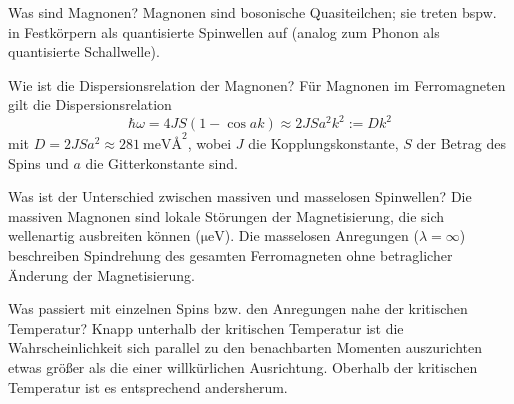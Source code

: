 \begin{fquestion}{Was sind Magnonen?}
    Magnonen sind bosonische Quasiteilchen; sie treten bspw. in Festkörpern als quantisierte Spinwellen auf (analog zum Phonon als quantisierte Schallwelle).
\end{fquestion}

\begin{fquestion}{Wie ist die Dispersionsrelation der Magnonen?}
    Für Magnonen im Ferromagneten gilt die Dispersionsrelation 
    \[ \hbar \omega = 4 J S (1 - \cos a k) \approx 2 J S a^2 k^2 := D k^2 \]
    mit $D = 2 J S a^2 \approx \SI{281}{\milli\electronvolt\angstrom\squared}$, wobei $J$ die Kopplungskonstante, $S$ der Betrag des Spins und $a$ die Gitterkonstante sind.
\end{fquestion}






\begin{fquestion}{Was ist der Unterschied zwischen massiven und masselosen Spinwellen?}
    Die massiven Magnonen sind lokale Störungen der Magnetisierung, die sich wellenartig ausbreiten können ($\si{\micro\electronvolt}$).
    Die masselosen Anregungen ($\lambda = \infty$) beschreiben Spindrehung des gesamten Ferromagneten ohne betraglicher Änderung der Magnetisierung.
\end{fquestion}

\begin{fquestion}{Was passiert mit einzelnen Spins bzw. den Anregungen nahe der kritischen Temperatur?}
    Knapp unterhalb der kritischen Temperatur ist die Wahrscheinlichkeit sich parallel zu den benachbarten Momenten auszurichten etwas größer als die einer willkürlichen Ausrichtung. 
    Oberhalb der kritischen Temperatur ist es entsprechend andersherum.
\end{fquestion}


